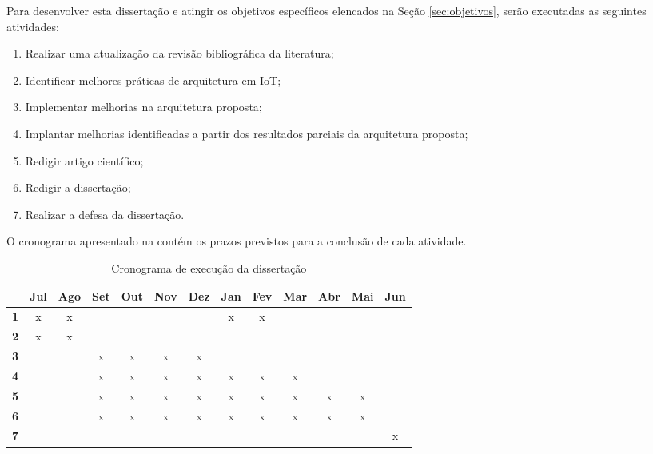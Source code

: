 \label{cap:cronograma}

Para desenvolver esta dissertação e atingir os objetivos específicos elencados na Seção \ref{sec:objetivos}, serão executadas as seguintes atividades:

\begin{enumerate}
\item Realizar uma atualização da revisão bibliográfica da literatura;
\item Identificar melhores práticas de arquitetura em \acrlong{IoT};
\item Implementar melhorias na arquitetura proposta;
\item Implantar melhorias identificadas a partir dos resultados parciais da arquitetura proposta;
\item Redigir artigo científico;
\item Redigir a dissertação;
\item Realizar a defesa da dissertação. 
\end{enumerate}

O cronograma apresentado na  contém os prazos previstos para a conclusão de cada atividade.

\begin{table}[htb!]
\caption{Cronograma de execução da dissertação}
\label{tab:cronograma-trabalho}
\begin{tabular}
{|c|c|c|c|c|c|c|c|c|c|c|c|c|}
\hline 
& \textbf{Jul} & \textbf{Ago} & \textbf{Set} & \textbf{Out} & \textbf{Nov} & \textbf{Dez} & \textbf{Jan} & \textbf{Fev} & \textbf{Mar} & \textbf{Abr} & \textbf{Mai} & \textbf{Jun} 								\\ \hline
\textbf{1} & x & x & & & & & x & x & & & & 		       		\\ \hline
\textbf{2} & x & x & & & & & & & & & & 		  	   			\\ \hline
\textbf{3} & & & x & x & x & x & & & & & & 	  				\\ \hline
\textbf{4} & & & x & x & x & x & x & x & x & & & 	  		\\ \hline
\textbf{5} & & & x & x & x & x & x & x & x & x & x & 	  	\\ \hline
\textbf{6} & & & x & x & x & x & x & x & x & x & x & 	  	\\ \hline
\textbf{7} & & & & & & & & & & & & x	  					\\ \hline
\end{tabular}
\end{table}